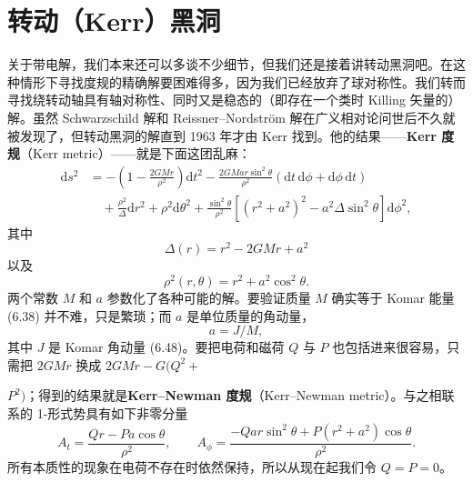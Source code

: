 \section{转动（Kerr）黑洞}

关于带电解，我们本来还可以多谈不少细节，但我们还是接着讲转动黑洞吧。在这种情形下寻找度规的精确解要困难得多，因为我们已经放弃了球对称性。我们转而寻找绕转动轴具有轴对称性、同时又是稳态的（即存在一个类时 Killing 矢量的）解。虽然 Schwarzschild 解和 Reissner–Nordström 解在广义相对论问世后不久就被发现了，但转动黑洞的解直到 1963 年才由 Kerr 找到。他的结果——\textbf{Kerr 度规}（Kerr metric）——就是下面这团乱麻：
\begin{equation*}
\boxed{\begin{aligned}
\mathrm{d}s^{2} &= -\left(1-\frac{2GMr}{\rho^{2}}\right)\mathrm{d}t^{2} - \frac{2GMar\sin^{2}\theta}{\rho^{2}}\left(\mathrm{d}t\,\mathrm{d}\phi + \mathrm{d}\phi\,\mathrm{d}t\right)\\
&\quad + \frac{\rho^{2}}{\Delta}\mathrm{d}r^{2} + \rho^{2}\mathrm{d}\theta^{2} + \frac{\sin^{2}\theta}{\rho^{2}}\left[(r^{2}+a^{2})^{2} - a^{2}\Delta\sin^{2}\theta\right]\mathrm{d}\phi^{2},
\end{aligned}}
\tag{6.70}
\end{equation*}
其中
\begin{equation*}
\boxed{\,\Delta(r) = r^{2} - 2GMr + a^{2}\,}
\tag{6.71}
\end{equation*}
以及
\begin{equation*}
\boxed{\,\rho^{2}(r,\theta) = r^{2} + a^{2}\cos^{2}\theta.\,}
\tag{6.72}
\end{equation*}
两个常数 $M$ 和 $a$ 参数化了各种可能的解。要验证质量 $M$ 确实等于 Komar 能量 (6.38) 并不难，只是繁琐；而 $a$ 是单位质量的角动量，
\begin{equation*}
a = J/M,
\tag{6.73}
\end{equation*}
其中 $J$ 是 Komar 角动量 (6.48)。要把电荷和磁荷 $Q$ 与 $P$ 也包括进来很容易，只需把 $2GMr$ 换成 $2GMr-G(Q^{2}+$

$P^{2})$；得到的结果就是\textbf{Kerr–Newman 度规}（Kerr–Newman metric）。与之相联系的 1-形式势具有如下非零分量
\begin{equation*}
A_{t} = \frac{Qr - Pa\cos\theta}{\rho^{2}}, \qquad A_{\phi} = \frac{-Qar\sin^{2}\theta + P(r^{2}+a^{2})\cos\theta}{\rho^{2}}.
\tag{6.74}
\end{equation*}
所有本质性的现象在电荷不存在时依然保持，所以从现在起我们令 $Q=P=0$。

